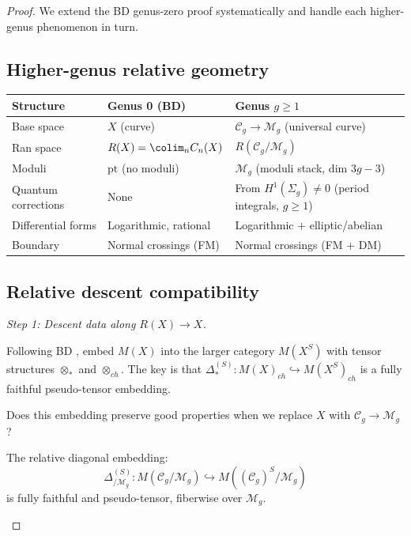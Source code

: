 \begin{proof}

We extend the BD genus-zero proof systematically and handle each higher-genus phenomenon in turn.

\subsection*{Higher-genus relative geometry}

\begin{center}
\begin{tabular}{|l|p{5cm}|p{5cm}|}
\hline
\textbf{Structure} & \textbf{Genus 0 (BD)} & \textbf{Genus $g \geq 1$} \\
\hline
Base space & $X$ (curve) & $\mathcal{C}_g \to \mathcal{M}_g$ (universal curve) \\
\hline
Ran space & $R(X) = \colim_n C_n(X)$ & $R(\mathcal{C}_g/\mathcal{M}_g)$ \\
\hline
Moduli & $\text{pt}$ (no moduli) & $\mathcal{M}_g$ (moduli stack, dim $3g-3$) \\
\hline
Quantum corrections & None & From $H^1(\Sigma_g) \neq 0$ (period integrals, $g \geq 1$) \\
\hline
Differential forms & Logarithmic, rational & Logarithmic + elliptic/abelian \\
\hline
Boundary & Normal crossings (FM) & Normal crossings (FM + DM) \\
\hline
\end{tabular}
\end{center}

\subsection*{Relative descent compatibility}

\emph{Step 1: Descent data along $R(X) \to X$.}

Following BD \cite[§3.4.10-3.4.11]{BD04}, embed $M(X)$ into the larger category
$M(X^S)$ with tensor structures $\otimes_*$ and $\otimes_{ch}$. The key is that
$\Delta^{(S)}_*: M(X)_{ch} \hookrightarrow M(X^S)_{ch}$ is a fully faithful
pseudo-tensor embedding.

Does this embedding preserve good properties when we replace $X$ with $\mathcal{C}_g \to \mathcal{M}_g$?

\begin{lemma}\label{lem:relative-diagonal}
The relative diagonal embedding:
\[\Delta^{(S)}_{/\mathcal{M}_g}: M(\mathcal{C}_g/\mathcal{M}_g) \hookrightarrow M((\mathcal{C}_g)^S/\mathcal{M}_g)\]
is fully faithful and pseudo-tensor, fiberwise over $\mathcal{M}_g$.
\end{lemma}


\end{proof}
